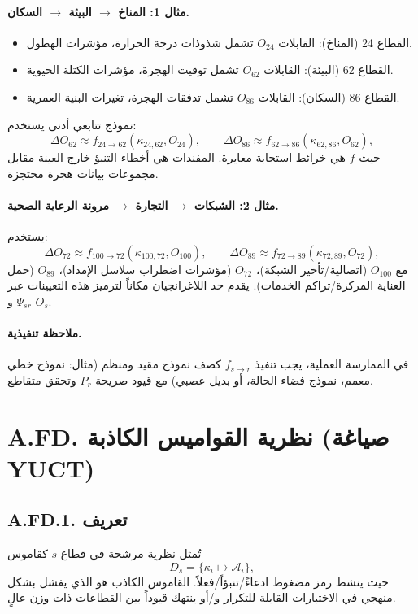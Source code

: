 \documentclass[13pt,a4paper]{article}
\begin{document}
	\paragraph{مثال 1: المناخ $\rightarrow$ البيئة $\rightarrow$ السكان.}
	\begin{itemize}[leftmargin=*]
		\item القطاع 24 (المناخ): القابلات $O_{24}$ تشمل شذوذات درجة الحرارة، مؤشرات الهطول.
		\item القطاع 62 (البيئة): القابلات $O_{62}$ تشمل توقيت الهجرة، مؤشرات الكتلة الحيوية.
		\item القطاع 86 (السكان): القابلات $O_{86}$ تشمل تدفقات الهجرة، تغيرات البنية العمرية.
	\end{itemize}
	نموذج تتابعي أدنى يستخدم:
	$$
	\Delta O_{62}\approx f_{24\to62}(\kappa_{24,62},O_{24}),\qquad
	\Delta O_{86}\approx f_{62\to86}(\kappa_{62,86},O_{62}),
	$$
	حيث $f$ هي خرائط استجابة معايرة. المفندات هي أخطاء التنبؤ خارج العينة مقابل مجموعات بيانات هجرة محتجزة.
	
	\paragraph{مثال 2: الشبكات $\rightarrow$ التجارة $\rightarrow$ مرونة الرعاية الصحية.}
	يستخدم:
	$$
	\Delta O_{72}\approx f_{100\to72}(\kappa_{100,72},O_{100}),\qquad
	\Delta O_{89}\approx f_{72\to89}(\kappa_{72,89},O_{72}),
	$$
	مع $O_{100}$ (اتصالية/تأخير الشبكة)، $O_{72}$ (مؤشرات اضطراب سلاسل الإمداد)، $O_{89}$ (حمل العناية المركزة/تراكم الخدمات). يقدم حد اللاغرانجيان مكاناً لترميز هذه التعيينات عبر $\Psi_{sr}$ و $O_s$.
	
	\paragraph{ملاحظة تنفيذية.}
	في الممارسة العملية، يجب تنفيذ $f_{s\to r}$ كصف نموذج مقيد ومنظم (مثال: نموذج خطي معمم، نموذج فضاء الحالة، أو بديل عصبي) مع قيود صريحة $P_r$ وتحقق متقاطع.
	
	\section*{A.FD. نظرية القواميس الكاذبة (صياغة YUCT)}
	
	\subsection*{A.FD.1. تعريف}
	تُمثل نظرية مرشحة في قطاع $s$ كقاموس
	\[
	D_s=\{\kappa_i\mapsto \mathcal{A}_i\},
	\]
	حيث ينشط رمز مضغوط ادعاءً/تنبؤاً/فعلاً. القاموس الكاذب هو الذي يفشل بشكل منهجي في الاختبارات القابلة للتكرار و/أو ينتهك قيوداً بين القطاعات ذات وزن عالٍ.
	
\end{document}
